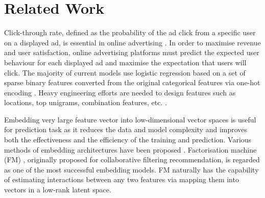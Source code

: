 \documentclass{llncs}
\begin{document}
\vspace{-5pt}
\section{Related Work}
\vspace{-5pt}




Click-through rate, defined as the probability of the ad click from a specific user on a displayed ad, is essential in online advertising \cite{wang2010click}. In order to maximise revenue and user satisfaction, online advertising platforms must predict the expected user behaviour for each displayed ad and maximise the expectation that users will click. The majority of current models use logistic regression based on a set of sparse binary features converted from the original categorical features via one-hot encoding \cite{lee2012estimating,richardson2007predicting}. Heavy engineering efforts are needed to design features such as locations, top unigrams, combination features, etc. \cite{he2014practical}.

Embedding very large feature vector into low-dimensional vector spaces is useful for prediction task as it reduces the data and model complexity and improves both the effectiveness and the efficiency of the training and prediction. Various methods of embedding architectures have been proposed \cite{tang2015line,kurashima2014probabilistic}.
Factorisation machine (FM) \cite{rendle2012factorization}, originally proposed for collaborative filtering recommendation, is regarded as one of the most successful embedding models. FM naturally has the capability of estimating interactions between any two features via mapping them into vectors in a low-rank latent space.
\end{document}
